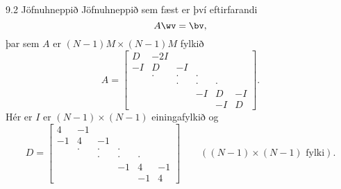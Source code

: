 \begin{frame}{9.2 Jöfnuhneppið}
Jöfnuhneppið sem fæst er því eftirfarandi
$$
A\wv = \bv,
$$ 
þar sem $A$ er $(N-1)M\times (N-1)M$ fylkið
$$
  A = \left[\begin{array}{cccccc}
D & -2I &   &   &   &  \\
-I & D & -I &   &   &  \\
  & \cdot & \cdot & \cdot &   &  \\
  &   & \cdot & \cdot & \cdot &  \\
  &   &  & -I & D & -I\\
  &   &   &   & -I & D
      \end{array}\right].
$$
Hér er $I$ er $(N-1)\times (N-1)$ einingafylkið og 
$$
  D = \left[\begin{array}{cccccc}
4 & -1 &   &   &   &  \\
-1 & 4 & -1 &   &   &  \\
  & \cdot & \cdot & \cdot &   &  \\
  &   & \cdot & \cdot & \cdot &  \\
  &   &  & -1 & 4 & -1\\
  &   &   &   & -1 & 4
      \end{array}\right] \qquad ((N-1)\times (N-1) \text{ fylki}).
$$
\end{frame}


